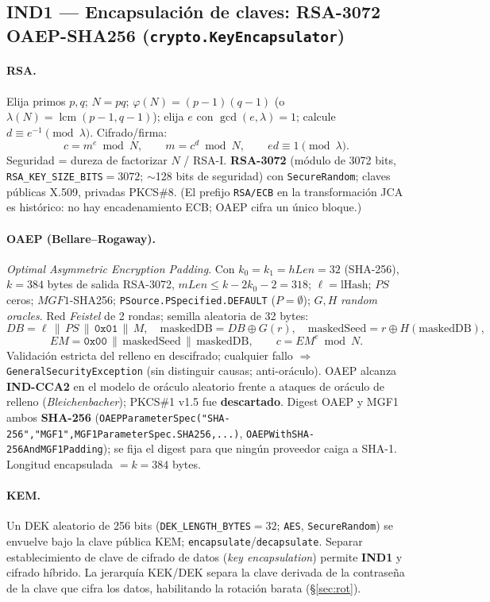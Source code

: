 \documentclass[11pt,a4paper]{article}
\begin{document}
\subsection{IND1 --- Encapsulación de claves: RSA-3072 OAEP-SHA256 (\texttt{crypto.KeyEncapsulator})}
\paragraph{RSA.} Elija primos $p, q$; $N = pq$; $\varphi(N) = (p-1)(q-1)$
(o $\lambda(N) = \operatorname{lcm}(p-1, q-1)$); elija $e$ con
$\gcd(e, \lambda)=1$; calcule $d \equiv e^{-1} \pmod{\lambda}$. Cifrado/firma:
\[
  c = m^{e} \bmod N,\qquad m = c^{d} \bmod N,\qquad ed \equiv 1 \pmod{\lambda}.
\]
Seguridad = dureza de factorizar $N$ / RSA-I. \textbf{RSA-3072} (módulo de 3072
bits, \texttt{RSA\_KEY\_SIZE\_BITS}$=3072$; $\sim$128 bits de seguridad) con
\texttt{SecureRandom}; claves públicas X.509, privadas PKCS\#8. (El prefijo
\texttt{RSA/ECB} en la transformación JCA es histórico: no hay encadenamiento ECB;
OAEP cifra un único bloque.)
\paragraph{OAEP (Bellare--Rogaway).} \emph{Optimal Asymmetric Encryption
Padding}. Con $k_0=k_1=hLen=32$ (SHA-256), $k=384$ bytes de salida RSA-3072,
$mLen \le k - 2k_0 - 2 = 318$; $\ell=\text{lHash}$; $PS$ ceros; $MGF1$-SHA256;
\texttt{PSource.PSpecified.DEFAULT} ($P=\emptyset$); $G,H$ \emph{random oracles}.
Red \emph{Feistel} de 2 rondas; semilla aleatoria de 32 bytes:
\[
  DB = \ell \,\|\, PS \,\|\, \mathtt{0x01} \,\|\, M,\quad
  \text{maskedDB} = DB \oplus G(r),\quad
  \text{maskedSeed} = r \oplus H(\text{maskedDB}),
\]
\[
  EM = \mathtt{0x00} \,\|\, \text{maskedSeed} \,\|\, \text{maskedDB},\qquad
  c = EM^{e} \bmod N.
\]
Validación estricta del relleno en descifrado; cualquier fallo $\Rightarrow$
\texttt{GeneralSecurityException} (sin distinguir causas; anti-oráculo).
OAEP alcanza \textbf{IND-CCA2} en el modelo de oráculo aleatorio frente a ataques
de oráculo de relleno (\emph{Bleichenbacher}); PKCS\#1 v1.5 fue \textbf{descartado}.
Digest OAEP y MGF1 ambos \textbf{SHA-256} (\texttt{OAEPParameterSpec("SHA-256","MGF1",MGF1ParameterSpec.SHA256,...)},
\texttt{OAEPWithSHA-256AndMGF1Padding}); se fija el digest para que ningún
proveedor caiga a SHA-1. Longitud encapsulada $=k=384$ bytes.
\paragraph{KEM.} Un DEK aleatorio de 256 bits (\texttt{DEK\_LENGTH\_BYTES}$=32$;
\texttt{AES}, \texttt{SecureRandom}) se envuelve bajo la clave pública KEM;
\texttt{encapsulate}/\texttt{decapsulate}. Separar establecimiento de clave de
cifrado de datos (\emph{key encapsulation}) permite \textbf{IND1} y cifrado
híbrido. La jerarquía KEK/DEK separa la clave derivada de la contraseña de la
clave que cifra los datos, habilitando la rotación barata (§\ref{sec:rot}).
\end{document}
